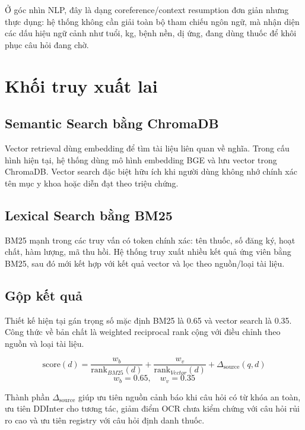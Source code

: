 Ở góc nhìn NLP, đây là dạng coreference/context resumption đơn giản nhưng thực dụng: hệ thống không cần giải toàn bộ tham chiếu ngôn ngữ, mà nhận diện các dấu hiệu ngữ cảnh như tuổi, kg, bệnh nền, dị ứng, đang dùng thuốc để khôi phục câu hỏi đang chờ.

\section{Khối truy xuất lai}

\subsection{Semantic Search bằng ChromaDB}

Vector retrieval dùng embedding để tìm tài liệu liên quan về nghĩa. Trong cấu hình hiện tại, hệ thống dùng mô hình embedding BGE và lưu vector trong ChromaDB. Vector search đặc biệt hữu ích khi người dùng không nhớ chính xác tên mục y khoa hoặc diễn đạt theo triệu chứng.

\subsection{Lexical Search bằng BM25}

BM25 mạnh trong các truy vấn có token chính xác: tên thuốc, số đăng ký, hoạt chất, hàm lượng, mã thu hồi. Hệ thống truy xuất nhiều kết quả ứng viên bằng BM25, sau đó mới kết hợp với kết quả vector và lọc theo nguồn/loại tài liệu.

\subsection{Gộp kết quả}

Thiết kế hiện tại gán trọng số mặc định BM25 là 0.65 và vector search là 0.35. Công thức về bản chất là weighted reciprocal rank cộng với điều chỉnh theo nguồn và loại tài liệu.

\begin{formulabox}
\[
\mathrm{score}(d)=
\frac{w_b}{\mathrm{rank}_{BM25}(d)}
+
\frac{w_v}{\mathrm{rank}_{Vector}(d)}
+
\Delta_{\mathrm{source}}(q,d)
\]
\[
w_b=0.65,\quad w_v=0.35
\]
\end{formulabox}

Thành phần \(\Delta_{\mathrm{source}}\) giúp ưu tiên nguồn cảnh báo khi câu hỏi có từ khóa an toàn, ưu tiên DDInter cho tương tác, giảm điểm OCR chưa kiểm chứng với câu hỏi rủi ro cao và ưu tiên registry với câu hỏi định danh thuốc.

